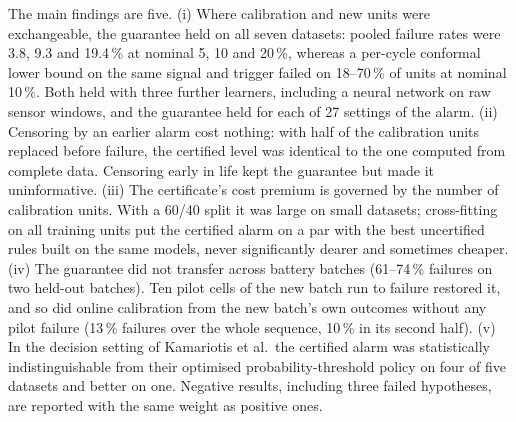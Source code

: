 The main findings are five. (i) Where calibration and new units were exchangeable, the guarantee held on all seven datasets: pooled failure rates were 3.8, 9.3 and 19.4\,\% at nominal 5, 10 and 20\,\%, whereas a per-cycle conformal lower bound on the same signal and trigger failed on 18--70\,\% of units at nominal 10\,\%. Both held with three further learners, including a neural network on raw sensor windows, and the guarantee held for each of 27 settings of the alarm. (ii) Censoring by an earlier alarm cost nothing: with half of the calibration units replaced before failure, the certified level was identical to the one computed from complete data. Censoring early in life kept the guarantee but made it uninformative. (iii) The certificate's cost premium is governed by the number of calibration units. With a 60/40 split it was large on small datasets; cross-fitting on all training units put the certified alarm on a par with the best uncertified rules built on the same models, never significantly dearer and sometimes cheaper. (iv) The guarantee did not transfer across battery batches (61--74\,\% failures on two held-out batches). Ten pilot cells of the new batch run to failure restored it, and so did online calibration from the new batch's own outcomes without any pilot failure (13\,\% failures over the whole sequence, 10\,\% in its second half). (v) In the decision setting of Kamariotis et al.\ the certified alarm was statistically indistinguishable from their optimised probability-threshold policy on four of five datasets and better on one. Negative results, including three failed hypotheses, are reported with the same weight as positive ones.
